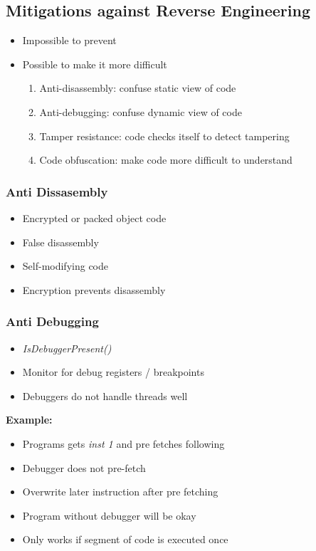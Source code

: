 \subsection{Mitigations against Reverse Engineering}
\begin{itemize}
    \item Impossible to prevent
    \item Possible to make it more difficult
    \begin{enumerate}
        \item Anti-disassembly: confuse static view of code
        \item Anti-debugging: confuse dynamic view of code
        \item Tamper resistance: code checks itself to detect tampering
        \item Code obfuscation: make code more difficult to understand
    \end{enumerate}
\end{itemize}

\subsubsection{Anti Dissasembly}
\begin{itemize}
    \item Encrypted or packed object code
    \item False disassembly
    \item Self-modifying code
    \item Encryption prevents disassembly
\end{itemize}

\subsubsection{Anti Debugging}
\begin{itemize}
    \item \textit{IsDebuggerPresent()}
    \item Monitor for debug registers / breakpoints
    \item Debuggers do not handle threads well
\end{itemize}
\textbf{Example:}
\begin{itemize}
    \item Programs gets \textit{inst 1} and pre fetches following
    \item Debugger does not pre-fetch
    \item Overwrite later instruction after pre fetching
    \item Program without debugger will be okay
    \item Only works if segment of code is executed once
\end{itemize}

